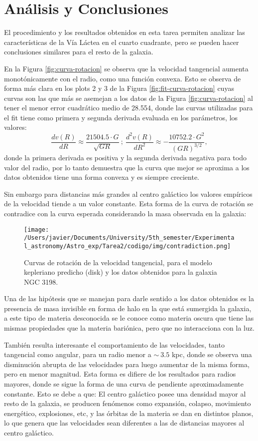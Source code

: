 \documentclass[letterpaper,oneside]{article}
\begin{document}
\section{Análisis y Conclusiones}
El procedimiento y los resultados obtenidos en esta tarea permiten analizar las características de la Vía Láctea en el cuarto cuadrante, pero se pueden hacer conclusiones similares para el resto de la galaxia.

En la Figura \ref{fig:curva-rotacion} se observa que la velocidad tangencial aumenta monotónicamente con el radio, como una función convexa. Esto se observa de forma más clara en los plots 2 y 3 de la Figura \ref{fig:fit-curva-rotacion} cuyas curvas son las que más se asemejan a los datos de la Figura \ref{fig:curva-rotacion} al tener el menor error cuadrático medio de 28.554, donde las curvas utilizadas para el fit tiene como primera y segunda derivada evaluada en los parámetros, los valores:
\[
 \frac{dv(R)}{dR} \approx \frac{21504.5\cdot G}{\sqrt{G R}} \ ; \  \frac{d^2v(R)}{dR^2} \approx -\frac{10752.2\cdot G^2}{(G R)^{3/2}},
\]
donde la primera derivada es positiva y la segunda derivada negativa para todo valor del radio, por lo tanto demuestra que la curva que mejor se aproxima a los datos obtenidos tiene una forma convexa y es siempre creciente.

Sin embargo para distancias más grandes al centro galáctico los valores empíricos de la velocidad tiende a un valor constante. Esta forma de la curva de rotación se contradice con la curva esperada considerando la masa observada en la galaxia:

\begin{figure}[H]
    \centering
    \texttt{[image: /Users/javier/Documents/University/5th\_semester/Experimental\_astronomy/Astro\_exp/Tarea2/codigo/img/contradiction.png]}
    \caption{Curvas de rotación de la velocidad tangencial, para el modelo kepleriano predicho (disk) y los datos obtenidos para la galaxia NGC 3198.}
    \label{fig:contradiction}
\end{figure}

Una de las hipótesis que se manejan para darle sentido a los datos obtenidos es la presencia de masa invisible en forma de halo en la que está sumergida la galaxia, a este tipo de materia desconocida se le conoce como materia oscura que tiene las mismas propiedades que la materia bariónica, pero que no interacciona con la luz.

También resulta interesante el comportamiento de las velocidades, tanto tangencial como angular, para un radio menor a $\sim \ 3.5$ kpc, donde se observa una disminución abrupta de las velocidades para luego aumentar de la misma forma, pero en menor magnitud. Esta forma es difiere de los resultados para radios mayores, donde se sigue la forma de una curva de pendiente aproximadamente constante. Esto se debe a que: El centro galáctico posee una densidad mayor al resto de la galaxia, se producen fenómenos como expansión, colapso, movimiento energético, explosiones, etc, y las órbitas de la materia se dan en distintos planos, lo que genera que las velocidades sean diferentes a las de distancias mayores al centro galáctico.
\end{document}
